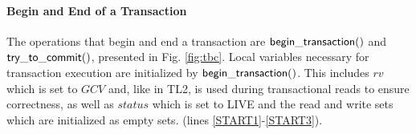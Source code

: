 \paragraph{Begin and End of a Transaction} 
The operations that begin and end a transaction are ${\sf begin\_transaction()}$ 
and ${\sf try\_to\_commit()}$, presented in Fig. \ref{fig:tbc}. 
Local variables necessary for transaction execution are initialized by  ${\sf begin\_transaction()}$.
This includes $\mathit{rv}$
which is set to $\mathit{GCV}$ and, like in TL2, is used during transactional
reads to ensure correctness, 
as well as $\mathit{status}$ which is set to LIVE and the read and write sets
which are initialized as empty sets.
(lines \ref{START1}-\ref{START3}). 

